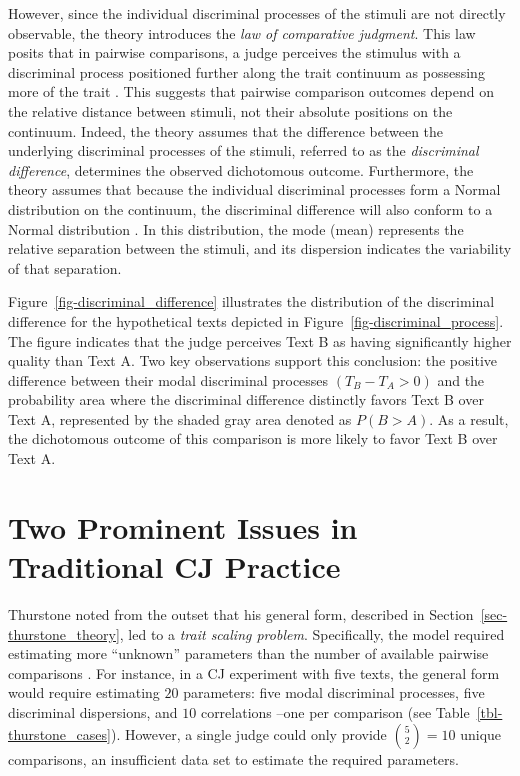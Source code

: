 \documentclass[
  authoryear,
  review,
  1p]{elsarticle}
\begin{document}
However, since the individual discriminal processes of the stimuli are
not directly observable, the theory introduces the \emph{law of
comparative judgment}. This law posits that in pairwise comparisons, a
judge perceives the stimulus with a discriminal process positioned
further along the trait continuum as possessing more of the trait
\citep[pp.~251]{Bramley_2008}. This suggests that pairwise comparison
outcomes depend on the relative distance between stimuli, not their
absolute positions on the continuum. Indeed, the theory assumes that the
difference between the underlying discriminal processes of the stimuli,
referred to as the \emph{discriminal difference}, determines the
observed dichotomous outcome. Furthermore, the theory assumes that
because the individual discriminal processes form a Normal distribution
on the continuum, the discriminal difference will also conform to a
Normal distribution \citep[pp.~452]{Andrich_1978}. In this distribution,
the mode (mean) represents the relative separation between the stimuli,
and its dispersion indicates the variability of that separation.

Figure~\ref{fig-discriminal_difference} illustrates the distribution of
the discriminal difference for the hypothetical texts depicted in
Figure~\ref{fig-discriminal_process}. The figure indicates that the
judge perceives Text B as having significantly higher quality than Text
A. Two key observations support this conclusion: the positive difference
between their modal discriminal processes \((T_{B} - T_{A} > 0)\) and
the probability area where the discriminal difference distinctly favors
Text B over Text A, represented by the shaded gray area denoted as
\(P(B > A)\). As a result, the dichotomous outcome of this comparison is
more likely to favor Text B over Text A.

\section{Two Prominent Issues in Traditional CJ
Practice}\label{sec-theory-issues}

Thurstone noted from the outset that his general form, described in
Section~\ref{sec-thurstone_theory}, led to a \emph{trait scaling
problem}. Specifically, the model required estimating more ``unknown''
parameters than the number of available pairwise comparisons
\citep[pp.~267]{Thurstone_1927b}. For instance, in a CJ experiment with
five texts, the general form would require estimating \(20\) parameters:
five modal discriminal processes, five discriminal dispersions, and
\(10\) correlations --one per comparison (see
Table~\ref{tbl-thurstone_cases}). However, a single judge could only
provide \({5 \choose 2} = 10\) unique comparisons, an insufficient data
set to estimate the required parameters.
\end{document}
